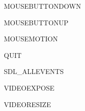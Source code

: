 \begin{datadesc}{MOUSEBUTTONDOWN}
\end{datadesc}
\begin{datadesc}{MOUSEBUTTONUP}
\end{datadesc}
\begin{datadesc}{MOUSEMOTION}
\end{datadesc}
\begin{datadesc}{QUIT}
\end{datadesc}
\begin{datadesc}{SDL_ALLEVENTS}
\end{datadesc}
\begin{datadesc}{VIDEOEXPOSE}
\end{datadesc}
\begin{datadesc}{VIDEORESIZE}
\end{datadesc}
